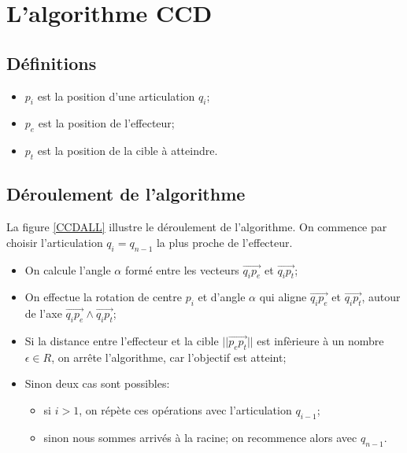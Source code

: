 \documentclass{article}
\begin{document}
 
\section{L'algorithme CCD}
\label{algo}

\subsection*{D\'efinitions}
\begin{itemize}
\item $p_i$ est la position d'une articulation $q_i$;
\item $p_e$ est la position de l'effecteur;
\item $p_t$ est la position de la cible \`a atteindre.
\end{itemize}


\DeleteShortVerb{|}

\subsection*{D\'eroulement de l'algorithme}
La figure \ref{CCDALL} illustre le d\'eroulement de l'algorithme.
On commence par choisir l'articulation $q_i = q_{n-1}$ la plus proche de l'effecteur.
\begin{itemize}
\item On calcule l'angle $\alpha$ form\'e entre les vecteurs $\vec{q_ip_e}$ et $\vec{q_ip_t}$;
\item On effectue la rotation de centre $p_i$ et d'angle $\alpha$ qui aligne $\vec{q_ip_e}$ et $\vec{q_ip_t}$, autour de l'axe $\vec{q_ip_e} \wedge \vec{q_ip_t}$;
\item Si la distance entre l'effecteur et la cible $||\vec{p_ep_t}||$ est inf\`erieure \`a un nombre $\epsilon \in R$, on arr\^ete l'algorithme, car l'objectif est atteint;
\item Sinon deux cas sont possibles:
	\begin{itemize}
	\item si $i > 1$, on r\'ep\`ete ces op\'erations avec l'articulation $q_{i-1}$;
	\item sinon nous sommes arriv\'es \`a la racine; on recommence alors avec $q_{n-1}$.
	\end{itemize}
\end{itemize}


\MakeShortVerb{|}
\end{document}
